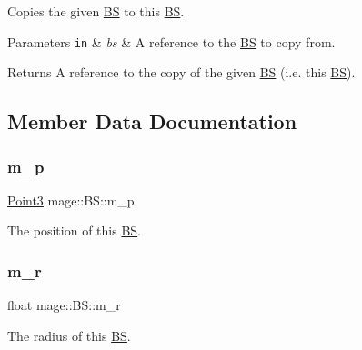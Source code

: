 Copies the given \hyperlink{structmage_1_1_b_s}{BS} to this \hyperlink{structmage_1_1_b_s}{BS}.


\begin{DoxyParams}[1]{Parameters}
\mbox{\tt in}  & {\em bs} & A reference to the \hyperlink{structmage_1_1_b_s}{BS} to copy from. \\
\hline
\end{DoxyParams}
\begin{DoxyReturn}{Returns}
A reference to the copy of the given \hyperlink{structmage_1_1_b_s}{BS} (i.\+e. this \hyperlink{structmage_1_1_b_s}{BS}). 
\end{DoxyReturn}


\subsection{Member Data Documentation}
\hypertarget{structmage_1_1_b_s_a6d63fae8fd20d26587ebd11efb1789d2}{}\label{structmage_1_1_b_s_a6d63fae8fd20d26587ebd11efb1789d2} 
\subsubsection{\texorpdfstring{m\+\_\+p}{m\_p}}
{\footnotesize\ttfamily \hyperlink{structmage_1_1_point3}{Point3} mage\+::\+B\+S\+::m\+\_\+p}

The position of this \hyperlink{structmage_1_1_b_s}{BS}. \hypertarget{structmage_1_1_b_s_a7a783b2ad117fc19a1caf548e3033df6}{}\label{structmage_1_1_b_s_a7a783b2ad117fc19a1caf548e3033df6} 
\subsubsection{\texorpdfstring{m\+\_\+r}{m\_r}}
{\footnotesize\ttfamily float mage\+::\+B\+S\+::m\+\_\+r}

The radius of this \hyperlink{structmage_1_1_b_s}{BS}. 